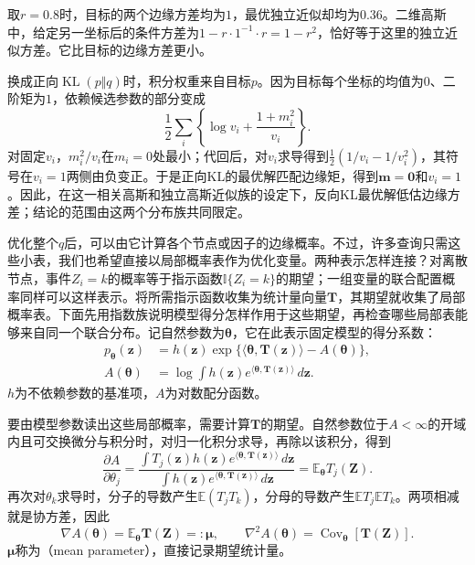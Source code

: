 取$r=0.8$时，目标的两个边缘方差均为$1$，最优独立近似却均为$0.36$。二维高斯中，给定另一坐标后的条件方差为$1-r\cdot1^{-1}\cdot r=1-r^2$，恰好等于这里的独立近似方差。它比目标的边缘方差更小。

换成正向$\operatorname{KL}(p\Vert q)$时，积分权重来自目标$p$。因为目标每个坐标的均值为$0$、二阶矩为$1$，依赖候选参数的部分变成
\[
  \frac12\sum_i\left\{\log v_i+\frac{1+m_i^2}{v_i}\right\}.
\]
对固定$v_i$，$m_i^2/v_i$在$m_i=0$处最小；代回后，对$v_i$求导得到$\tfrac12(1/v_i-1/v_i^2)$，其符号在$v_i=1$两侧由负变正。于是正向KL的最优解匹配边缘矩，得到$\bm m=\bm0$和$v_i=1$。因此，在这一相关高斯和独立高斯近似族的设定下，反向KL最优解低估边缘方差；结论的范围由这两个分布族共同限定。

优化整个$q$后，可以由它计算各个节点或因子的边缘概率。不过，许多查询只需这些小表，我们也希望直接以局部概率表作为优化变量。两种表示怎样连接？对离散节点，事件$Z_i=k$的概率等于指示函数$\mathbb I\{Z_i=k\}$的期望；一组变量的联合配置概率同样可以这样表示。将所需指示函数收集为统计量向量$\bm T$，其期望就收集了局部概率表。下面先用指数族说明模型得分怎样作用于这些期望，再检查哪些局部表能够来自同一个联合分布。记自然参数为$\bm\theta$，它在此表示固定模型的得分系数：
\begin{equation}
  \begin{aligned}
    p_{\bm{\theta}}(\bm{z})
      &=h(\bm{z})\exp\{\langle\bm{\theta},\bm{T}(\bm{z})\rangle
                      -A(\bm{\theta})\},\\
    A(\bm{\theta})
      &=\log\int h(\bm{z})
          e^{\langle\bm{\theta},\bm{T}(\bm{z})\rangle}\,d\bm{z}.
  \end{aligned}
  \label{eq:pgm-variational-exponential-family}
\end{equation}
$h$为不依赖参数的基准项，$A$为对数配分函数。

要由模型参数读出这些局部概率，需要计算$\bm T$的期望。自然参数位于$A<\infty$的开域内且可交换微分与积分时，对归一化积分求导，再除以该积分，得到
\[
  \frac{\partial A}{\partial\theta_j}
    =\frac{\int T_j(\bm z)h(\bm z)
                  e^{\langle\bm\theta,\bm T(\bm z)\rangle}\,d\bm z}
           {\int h(\bm z)e^{\langle\bm\theta,\bm T(\bm z)\rangle}\,d\bm z}
    =\mathbb E_{\bm\theta}T_j(\bm Z).
\]
再次对$\theta_k$求导时，分子的导数产生$\mathbb E(T_jT_k)$，分母的导数产生$\mathbb E T_j\mathbb E T_k$。两项相减就是协方差，因此
\begin{equation}
  \nabla A(\bm{\theta})=\mathbb E_{\bm{\theta}}\bm{T}(\bm{Z})
      =:\bm{\mu},\qquad
  \nabla^2 A(\bm{\theta})
      =\operatorname{Cov}_{\bm{\theta}}[\bm{T}(\bm{Z})].
  \label{eq:pgm-variational-moments}
\end{equation}
$\bm{\mu}$称为（mean parameter），直接记录期望统计量。

